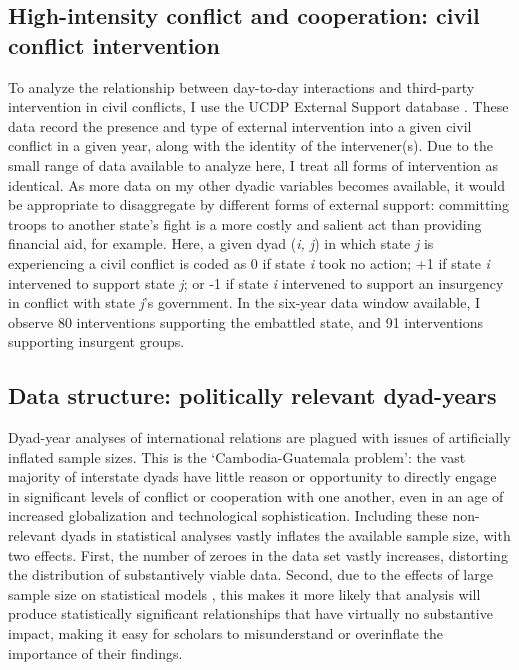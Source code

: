 \documentclass[10pt,]{article}
\begin{document}
\subsection{High-intensity conflict and cooperation: civil conflict
intervention}\label{high-intensity-conflict-and-cooperation-civil-conflict-intervention}

To analyze the relationship between day-to-day interactions and
third-party intervention in civil conflicts, I use the UCDP External
Support database \citep{Hoghbladh2011}. These data record the presence
and type of external intervention into a given civil conflict in a given
year, along with the identity of the intervener(s). Due to the small
range of data available to analyze here, I treat all forms of
intervention as identical. As more data on my other dyadic variables
becomes available, it would be appropriate to disaggregate by different
forms of external support: committing troops to another state's fight is
a more costly and salient act than providing financial aid, for example.
Here, a given dyad (\emph{i, j}) in which state \emph{j} is experiencing
a civil conflict is coded as 0 if state \emph{i} took no action; +1 if
state \emph{i} intervened to support state \emph{j}; or -1 if state
\emph{i} intervened to support an insurgency in conflict with state
\emph{j}'s government. In the six-year data window available, I observe
80 interventions supporting the embattled state, and 91 interventions
supporting insurgent groups.

\subsection{Data structure: politically relevant
dyad-years}\label{data-structure-politically-relevant-dyad-years}

Dyad-year analyses of international relations are plagued with issues of
artificially inflated sample sizes. This is the `Cambodia-Guatemala
problem': the vast majority of interstate dyads have little reason or
opportunity to directly engage in significant levels of conflict or
cooperation with one another, even in an age of increased globalization
and technological sophistication. Including these non-relevant dyads in
statistical analyses vastly inflates the available sample size, with two
effects. First, the number of zeroes in the data set vastly increases,
distorting the distribution of substantively viable data. Second, due to
the effects of large sample size on statistical models
\citep[2]{Head2015}, this makes it more likely that analysis will
produce statistically significant relationships that have virtually no
substantive impact, making it easy for scholars to misunderstand or
overinflate the importance of their findings.
\end{document}
